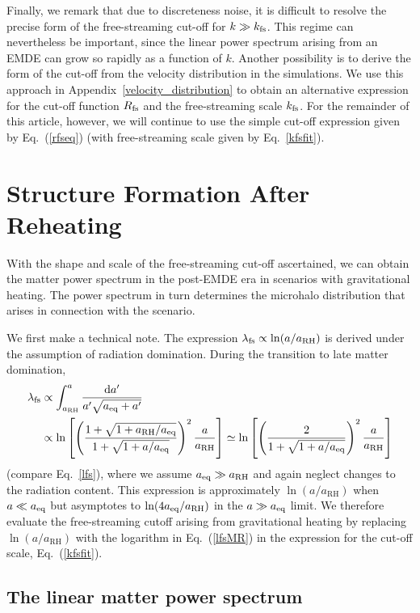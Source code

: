 \documentclass[a4paper,11pt]{article}
\newcommand{\rh}[1]{{#1}_{\mathrm{RH}}}
\newcommand{\lfs}{\lambda_{\rm fs}}
\newcommand{\kfs}{k_{\rm fs}}
\newcommand{\aeq}{a_{\rm eq}}
\newcommand{\rfs}{R_{\rm fs}}
\newcommand{\diff}{\ensuremath{\mathrm{d}}}
\begin{document}
Finally, we remark that due to discreteness noise, it is difficult to resolve the precise form of the free-streaming cut-off for $k\gg\kfs$. This regime can nevertheless be important, since the linear power spectrum arising from an EMDE can grow so rapidly as a function of $k$.
Another possibility is to derive the form of the cut-off from the velocity distribution in the simulations. We use this approach in Appendix~\ref{velocity_distribution} to obtain an alternative expression for the cut-off function $\rfs$ and the free-streaming scale $\kfs$.
For the remainder of this article, however, we will continue to use the simple cut-off expression given by Eq.~(\ref{rfseq}) (with free-streaming scale given by Eq.~\ref{kfsfit}).


\section{Structure Formation After Reheating}
\label{latestructure}

With the shape and scale of the free-streaming cut-off ascertained, we can obtain the matter power spectrum in the post-EMDE era in scenarios with gravitational heating. The power spectrum in turn determines the microhalo distribution that arises in connection with the scenario.

We first make a technical note. The expression $\lfs \propto \ln(a/\rh{a})$ is derived under the assumption of radiation domination.
During the transition to late matter domination,
\begin{align}\label{lfsMR}
    \lfs
    &\propto \int_{\rh{a}}^a
    \frac{\diff a^\prime}{a^{\prime} \sqrt{\aeq+a^\prime}}
    \nonumber\\
    &\propto \ln\left[\left(\frac{1+\sqrt{1+\rh{a}/\aeq}}{1+\sqrt{1+a/\aeq}}\right)^2\frac{a}{\rh{a}}\right]
    \simeq \ln\left[\left(\frac{2}{1+\sqrt{1+a/\aeq}}\right)^2\frac{a}{\rh{a}}\right]
\end{align}
(compare Eq.~\ref{lfs}), where we assume $\aeq\gg\rh{a}$ and again neglect changes to the radiation content.
This expression is approximately $\ln(a/\rh{a})$ when $a\ll\aeq$ but asymptotes to $\ln(4\aeq/\rh{a})$ in the $a\gg\aeq$ limit.
We therefore evaluate the free-streaming cutoff arising from gravitational heating by replacing $\ln(a/\rh{a})$ with the logarithm in Eq.~(\ref{lfsMR}) in the expression for the cut-off scale, Eq.~(\ref{kfsfit}). 


\subsection{The linear matter power spectrum}
\end{document}
